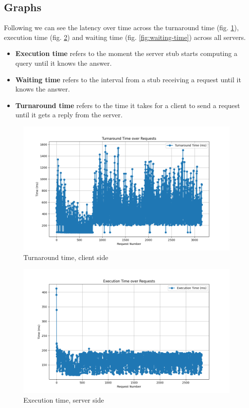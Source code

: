\documentclass{article}
\begin{document}
\subsection{Graphs}
Following we can see the latency over time across the turnaround time (fig. \ref{fig:turnaround-time}), execution time (fig. \ref{fig:execution-time}) and waiting time (fig. \ref{fig:waiting-time}) across all servers.

\begin{itemize}
    \item \textbf{Execution time} refers to the moment the server stub starts computing a query until it knows the answer.
    \item \textbf{Waiting time} refers to the interval from a stub receiving a request until it knows the answer.
    \item \textbf{Turnaround time} refers to the time it takes for a client to send a request until it gets a reply from the server.
\end{itemize}

\begin{figure}
    \centering
    \includegraphics[width=1.0\linewidth]{Turnaround Time.png}
    \caption{Turnaround time, client side}
    \label{fig:turnaround-time}
\end{figure}

\begin{figure}
    \centering
    \includegraphics[width=1.0\linewidth]{Execution Time.png}
    \caption{Execution time, server side}
    \label{fig:execution-time}
\end{figure}
\end{document}
